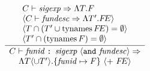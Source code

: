 \begin{equation}
\label{fundesc-rule}
\frac{\begin{array}{l}
       C\vdash{\it sigexp}\Rightarrow\Lambda{\ensuremath{T}}{.}{\ensuremath{F}}\\
       \langle C\vdash{\it fundesc}\Rightarrow\Lambda{\ensuremath{T}'}{.}{\ensuremath{F\!E}} \rangle \\
       \langle T \cap (T' \cup \mathop{\rm tynames}\nolimits F\!E) = \emptyset \rangle\\
       \langle T' \cap (\mathop{\rm tynames}\nolimits F) = \emptyset \rangle
       \end{array}}
     {\begin{array}{c}
       C\vdash\mbox{{\it funid}\ {\tt :} {\it sigexp}\ $\langle{\tt and}\ {\it fundesc}\rangle$}\Rightarrow\\
         \Lambda{\ensuremath{T}\langle\cup\ensuremath{T}'\rangle}{.}{\{{\it funid}\mapsto\ensuremath{F}\}\ \langle +\ \ensuremath{F\!E}\rangle}
        \end{array}
     } 
\end{equation}





